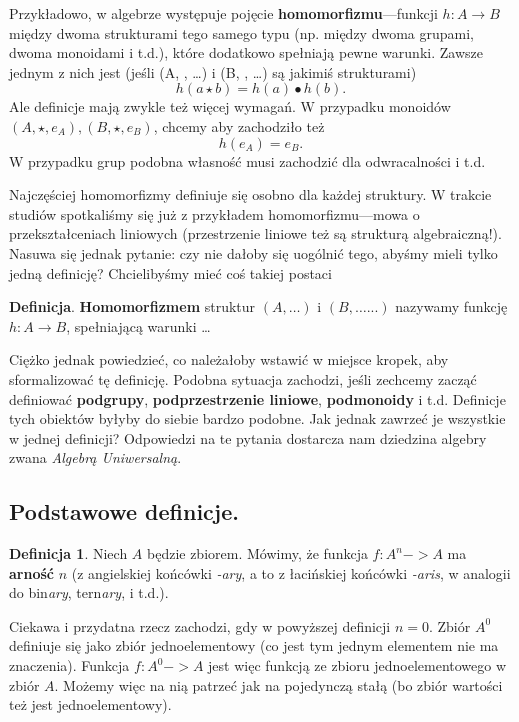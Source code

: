 \documentclass{article}
\theoremstyle{definition}
\newtheorem{definition}{Definicja}[section]
\begin{document}
Przykładowo,
w algebrze występuje pojęcie \textbf{homomorfizmu}---funkcji $h: A \to B$ między dwoma strukturami tego samego typu (np. między dwoma grupami, dwoma monoidami i t.d.),
które dodatkowo spełniają pewne warunki.
Zawsze jednym z nich jest (jeśli (A, \star, \dots) i (B, \bullet, \dots) są jakimiś strukturami)
\begin{equation}
	h(a\star b) = h(a) \bullet h(b).
\end{equation}
Ale definicje mają zwykle też więcej wymagań.
W przypadku monoidów $(A, \star, e_A), (B, \star, e_B)$,
chcemy aby zachodziło też
\begin{equation}
	h(e_A) = e_B.
\end{equation}
W przypadku grup podobna własność musi zachodzić dla odwracalności i t.d.

Najczęściej homomorfizmy definiuje się osobno dla każdej struktury.
W trakcie studiów spotkaliśmy się już z przykładem homomorfizmu---mowa o przekształceniach liniowych (przestrzenie liniowe też są strukturą algebraiczną!).
Nasuwa się jednak pytanie: czy nie dałoby się uogólnić tego, abyśmy mieli tylko jedną definicję? Chcielibyśmy mieć coś takiej postaci

\noindent \textbf{Definicja}. \textbf{Homomorfizmem} struktur $(A, \dots)$ i $(B, \dots...)$ nazywamy funkcję $h: A \to B$, spełniającą warunki \dots

Ciężko jednak powiedzieć, co należałoby wstawić w miejsce kropek, aby sformalizować tę definicję.
Podobna sytuacja zachodzi,
jeśli zechcemy zacząć definiować \textbf{podgrupy}, \textbf{podprzestrzenie liniowe}, \textbf{podmonoidy} i t.d.
Definicje tych obiektów byłyby do siebie bardzo podobne.
Jak jednak zawrzeć je wszystkie w jednej definicji?
Odpowiedzi na te pytania dostarcza nam dziedzina algebry zwana \textit{Algebrą Uniwersalną}.

\subsection{Podstawowe definicje.}

\begin{definition}
	Niech $A$ będzie zbiorem.
	Mówimy, że funkcja $f: A^n -> A$ ma \textbf{arność} $n$ (z angielskiej końcówki \textit{-ary}, a to z łacińskiej końcówki \textit{-aris}, w analogii do bin\textit{ary}, tern\textit{ary}, i t.d.).
\end{definition}

Ciekawa i przydatna rzecz zachodzi, gdy w powyższej definicji $n = 0$.
Zbiór $A^0$ definiuje się jako zbiór jednoelementowy (co jest tym jednym elementem nie ma znaczenia).
Funkcja $f:A^0 -> A$ jest więc funkcją ze zbioru jednoelementowego w zbiór $A$.
Możemy więc na nią patrzeć jak na pojedynczą stałą (bo zbiór wartości też jest jednoelementowy).
\end{document}

